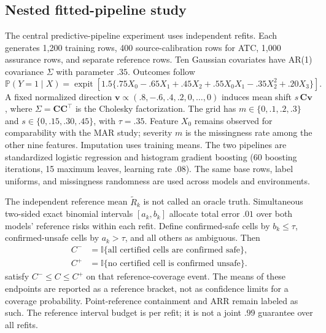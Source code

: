 \documentclass[twoside,11pt]{article}
\newcommand{\Pp}{\mathbb P}
\begin{document}
\subsection{Nested fitted-pipeline study}
\label{sec:nested}
The central predictive-pipeline experiment uses \NestedReps{} independent refits. Each generates
1,200 training rows, 400 source-calibration rows for ATC, 1,000 assurance rows, and
\ReferenceN{} separate reference rows. Ten Gaussian covariates have AR(1) covariance $\Sigma$ with
parameter $.35$. Outcomes follow
\begin{equation}
\Pp(Y=1\mid X)=\operatorname{expit}\left[1.5\{.75X_0-.65X_1+.45X_2
+ .55X_0X_1-.35X_2^2+.20X_3\}\right].
\label{eq:dgp}
\end{equation}
A fixed normalized direction $\mathbf v\propto(.8,-.6,.4,.2,0,\ldots,0)$ induces mean shift
$s\,\mathbf C\mathbf v$, where $\Sigma=\mathbf C\mathbf C^\top$ is the Cholesky factorization.
The grid has $m\in\{0,.1,.2,.3\}$ and $s\in\{0,.15,.30,.45\}$, with $\tau=.35$.
Feature $X_0$ remains observed for comparability with the MAR study; severity $m$ is the
missingness rate among the other nine features. Imputation uses training means.
The two pipelines are standardized logistic regression and histogram gradient boosting
(60 boosting iterations, 15 maximum leaves, learning rate $.08$). The same base rows,
label uniforms, and missingness randomness are used across models and environments.

The independent reference mean $\widetilde R_k$ is not called an oracle truth. Simultaneous
two-sided exact binomial intervals $[a_k,b_k]$ allocate total error $.01$ over both models'
reference risks within each refit. Define confirmed-safe cells by $b_k\leq\tau$,
confirmed-unsafe cells by $a_k>\tau$, and all others as ambiguous. Then
\begin{equation}
\begin{aligned}
C^- &=\mathbb I\{\text{all certified cells are confirmed safe}\},\\
C^+ &=\mathbb I\{\text{no certified cell is confirmed unsafe}\}.
\end{aligned}
\label{eq:reference}
\end{equation}
satisfy $C^-\leq C\leq C^+$ on that reference-coverage event. The means of these endpoints
are reported as a reference bracket, not as confidence limits for a coverage probability.
Point-reference containment and ARR remain labeled as such. The reference interval budget
is per refit; it is not a joint $.99$ guarantee over all refits.
\end{document}
